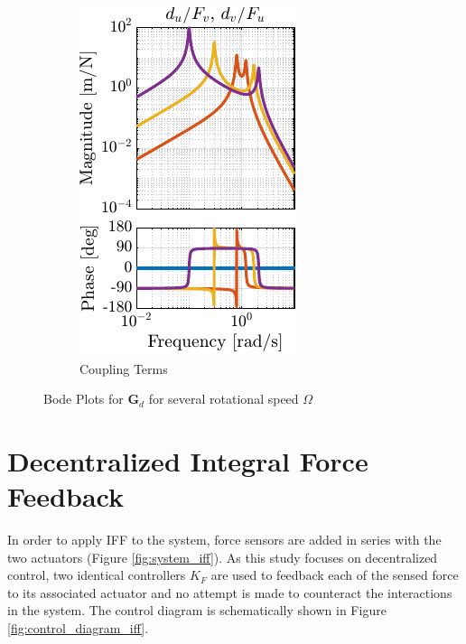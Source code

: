 \documentclass[10pt]{iopart}
\begin{document}
\begin{figure}[htbp]
\begin{subfigure}[c]{0.48\linewidth}
\includegraphics[width=\linewidth]{figs/fig03b.pdf}
\caption{\label{fig:plant_compare_rotating_speed_coupling} Coupling Terms}
\end{subfigure}
\hfill
\caption{\label{fig:plant_compare_rotating_speed}Bode Plots for \(\mathbf{G}_d\) for several rotational speed \(\Omega\)}
\centering
\end{figure}

\section{Decentralized Integral Force Feedback}
\label{sec:org7b1adf9}
\label{sec:iff}
In order to apply IFF to the system, force sensors are added in series with the two actuators (Figure \ref{fig:system_iff}).
As this study focuses on decentralized control, two identical controllers \(K_F\) are used to feedback each of the sensed force to its associated actuator and no attempt is made to counteract the interactions in the system.
The control diagram is schematically shown in Figure \ref{fig:control_diagram_iff}.
\end{document}
